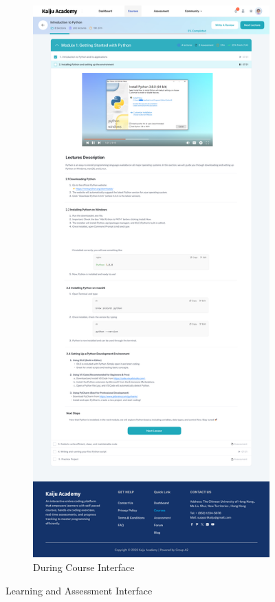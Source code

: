 \documentclass[a4paper, 11pt]{scrreprt}
\begin{document}
\begin{figure}[ht]
    \hfill
    \begin{subfigure}[b]{0.47\textwidth}
        \centering
        \includegraphics[width=\textwidth]{UI/During Course.jpg}
        \caption{During Course Interface}
    \end{subfigure}
    \caption{Learning and Assessment Interface}
\end{figure}
\end{document}
